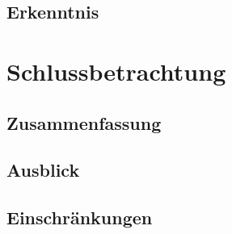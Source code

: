 \documentclass[11pt, a4paper]{book}
\begin{document}
\section{Erkenntnis}

\chapter{Schlussbetrachtung}
\section{Zusammenfassung}
\section{Ausblick}
\section{Einschränkungen}



\clearpage\newpage
{}




\clearpage\newpage
\begin{appendix}
  
\end{appendix}
\end{document}
